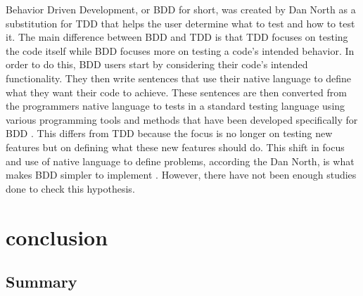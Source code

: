 \documentclass{sig-alternate}
\begin{document}

Behavior Driven Development, or BDD for short, was created by Dan North as a substitution for TDD that helps the user determine what to test and how to test it.  The main difference between BDD and TDD is that TDD focuses on testing the code itself while BDD focuses more on testing a code's intended behavior. In order to do this, BDD users start by considering their code's intended functionality.  They then write sentences that use their native language to define what they want their code to achieve.  These sentences are then converted from the programmers native language to tests in a standard testing language using various programming tools and methods that have been developed specifically for BDD \cite{Soeken:2012, North:xxx, Hammond:2012}. This differs from TDD because the focus is no longer on testing new features but on defining what these new features should do.  This shift in focus and use of native language to define problems, according the Dan North, is what makes BDD simpler to implement \cite{North:xxx}.  However, there have not been enough studies done to check this hypothesis.

\section{conclusion}
\subsection{Summary}
\end{document}
